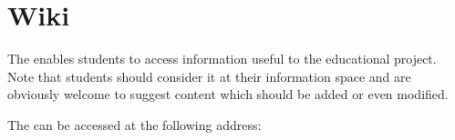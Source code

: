 %
%

\section{Wiki}

The  enables students to access information useful to the
 educational project. Note that students should consider it
at their information space and are obviously welcome to suggest content
which should be added or even modified.

The   can be accessed at the following address:

\begin{center}
\end{center}
